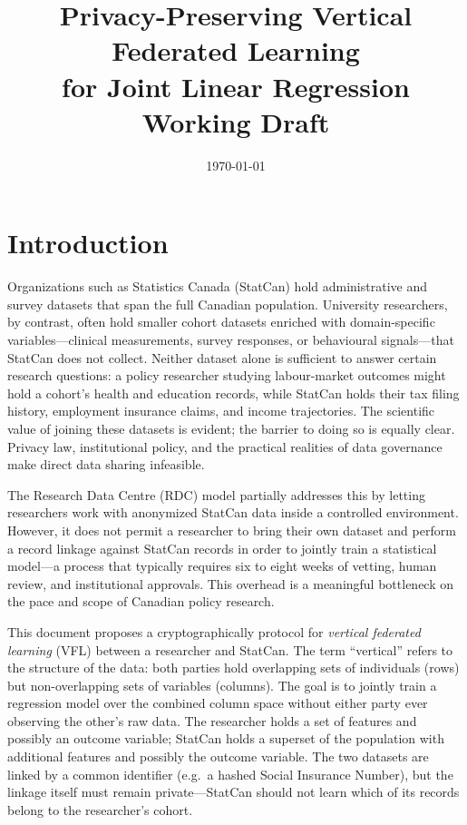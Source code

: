 \documentclass[12pt]{article}
\title{%
  \textbf{Privacy-Preserving Vertical Federated Learning}\\[4pt]
  \large for Joint Linear Regression\\[8pt]
  \normalsize Working Draft
}
\date{\today}
\theoremstyle{definition}
\theoremstyle{plain}
\begin{document}
\maketitle
\tableofcontents
\newpage

\section{Introduction}

Organizations such as Statistics Canada (StatCan) hold administrative and survey datasets that span the full Canadian population. University researchers, by contrast, often hold smaller cohort datasets enriched with domain-specific variables---clinical measurements, survey responses, or behavioural signals---that StatCan does not collect. Neither dataset alone is sufficient to answer certain research questions: a policy researcher studying labour-market outcomes might hold a cohort's health and education records, while StatCan holds their tax filing history, employment insurance claims, and income trajectories. The scientific value of joining these datasets is evident; the barrier to doing so is equally clear. Privacy law, institutional policy, and the practical realities of data governance make direct data sharing infeasible.

The Research Data Centre (RDC) model partially addresses this by letting researchers work with anonymized StatCan data inside a controlled environment. However, it does not permit a researcher to bring their own dataset and perform a record linkage against StatCan records in order to jointly train a statistical model---a process that typically requires six to eight weeks of vetting, human review, and institutional approvals. This overhead is a meaningful bottleneck on the pace and scope of Canadian policy research.

This document proposes a cryptographically protocol for \emph{vertical federated learning} (VFL) between a researcher and StatCan. The term ``vertical'' refers to the structure of the data: both parties hold overlapping sets of individuals (rows) but non-overlapping sets of variables (columns). The goal is to jointly train a regression model over the combined column space without either party ever observing the other's raw data. The researcher holds a set of features and possibly an outcome variable; StatCan holds a superset of the population with additional features and possibly the outcome variable. The two datasets are linked by a common identifier (e.g.\ a hashed Social Insurance Number), but the linkage itself must remain private---StatCan should not learn which of its records belong to the researcher's cohort.
\end{document}
